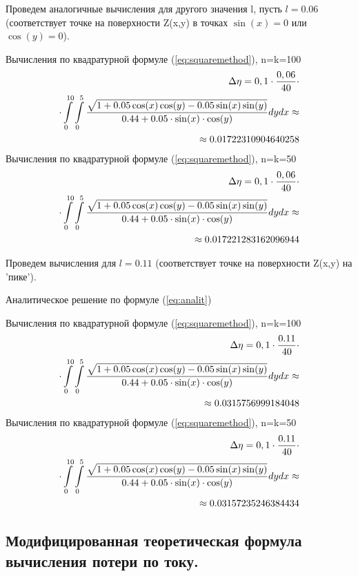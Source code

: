 \documentclass{article}
\begin{document}
Проведем аналогичные вычисления для другого значения l, пусть $l=0.06$ (соответствует точке на поверхности Z(x,y) в точках $\sin(x)=0$ или $\cos(y)=0$). %

Вычисления по квадратурной формуле (\ref{eq:squaremethod}), n=k=100
\begin{align}\label{eq:sq2med10}
\Delta \eta = 0,1 \cdot \frac{0,06}{40} \cdot \notag \\
\cdot \int\limits_0^{10} \int\limits_0^5 \frac{\sqrt{1+0.05 \cos(x)\cos(y)-0.05 \sin(x)\sin(y)}}{0.44 + 0.05 \cdot \sin(x) \cdot \cos(y)} dy dx \approx \notag \\ \approx 0.01722310904640258
\end{align}
Вычисления по квадратурной формуле (\ref{eq:squaremethod}), n=k=50
\begin{align}\label{eq:sq2med5}
\Delta \eta = 0,1 \cdot \frac{0,06}{40} \cdot \notag \\
\cdot \int\limits_0^{10} \int\limits_0^5 \frac{\sqrt{1+0.05 \cos(x)\cos(y)-0.05 \sin(x)\sin(y)}}{0.44 + 0.05 \cdot \sin(x) \cdot \cos(y)} dy dx \approx \notag \\ \approx 0.017221283162096944
\end{align}

Проведем вычисления для $l=0.11$ (соответствует точке на поверхности Z(x,y) на 'пике'). %

Аналитическое решение по формуле (\ref{eq:analit})

Вычисления по квадратурной формуле (\ref{eq:squaremethod}), n=k=100
\begin{align}\label{eq:sq2max10}
\Delta \eta = 0,1 \cdot \frac{0.11}{40} \cdot \notag \\
\cdot \int\limits_0^{10} \int\limits_0^5 \frac{\sqrt{1+0.05 \cos(x)\cos(y)-0.05 \sin(x)\sin(y)}}{0.44 + 0.05 \cdot \sin(x) \cdot \cos(y)} dy dx \approx \notag \\ \approx 0.0315756999184048
\end{align}
Вычисления по квадратурной формуле (\ref{eq:squaremethod}), n=k=50
\begin{align}\label{eq:sq2max5}
\Delta \eta = 0,1 \cdot \frac{0.11}{40} \cdot \notag \\
\cdot \int\limits_0^{10} \int\limits_0^5 \frac{\sqrt{1+0.05 \cos(x)\cos(y)-0.05 \sin(x)\sin(y)}}{0.44 + 0.05 \cdot \sin(x) \cdot \cos(y)} dy dx \approx \notag \\ \approx 0.03157235246384434
\end{align}

\subsection{Модифицированная теоретическая формула вычисления потери по току.}\label{sec:mod}
\end{document}

